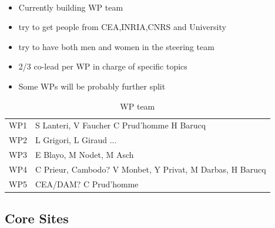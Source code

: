 \begin{frame}[fragile=singleslide]{\insertsectionhead}
  \framesubtitle{\insertsubsectionhead}
  \begin{itemize}
      \item Currently building WP team
      \item try to get people from CEA,INRIA,CNRS and University
      \item try to have both men and women in the steering team
      \item 2/3 co-lead per WP in charge of specific topics
      \item Some WPs will be probably further split
  \end{itemize}
  \begin{table}[]
      \centering
      \begin{tabular}{c|l}
          WP1 &  S Lanteri, V Faucher C Prud'homme H Barucq\\
          WP2&  L Grigori, L Giraud ...\\
          WP3& E Blayo, M Nodet, M Asch \\
          WP4& C Prieur, Cambodo? V Monbet, Y Privat, M Darbas, H Barucq \\
          WP5 & CEA/DAM? C Prud'homme
      \end{tabular}
      \caption{WP team}
      \label{tab:my_label}
  \end{table}

\end{frame}

\subsection{Core Sites}

